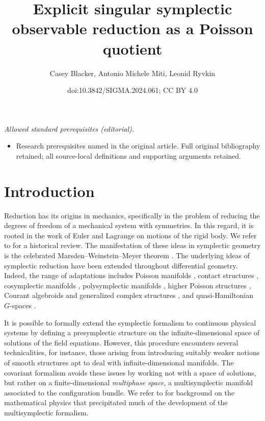 \documentclass[10pt,a4paper]{amsart}
\title{Explicit singular symplectic observable reduction as a Poisson quotient}
\author{Casey Blacker, Antonio Michele Miti, Leonid Ryvkin}
\date{doi:10.3842/SIGMA.2024.061; CC BY 4.0}
\numberwithin{equation}{section}
\begin{document}
\maketitle
\noindent\textit{Allowed standard prerequisites (editorial).}\begin{itemize}
\item Research prerequisites named in the original article. Full original bibliography retained; all source-local definitions and supporting arguments retained.
\end{itemize}\medskip
\section{Introduction}

Reduction has its origins in mechanics, specifically in the problem of reducing the degrees of freedom of a mechanical system with symmetries. In this regard, it is rooted in the work of Euler and Lagrange on motions of the rigid body. We refer to \cite{CendraMarsdenRatiu01, MarsdenWeinstein01} for a historical review. The manifestation of these ideas in symplectic geometry is the celebrated Marsden--Weinstein--Meyer theorem \cite{MarsdenWeinstein74,Meyer73}. The underlying ideas of symplectic reduction have been extended throughout differential geometry. Indeed, the range of adaptations includes Poisson manifolds \cite{MarsdenRatiu86,Willett02}, contact structures \cite{deLeonLainzValcazar19,Willett02}, cosymplectic manifolds \cite{Albert89}, polysymplectic manifolds \cite{MarreroRoman-RoySalgadoVilarino15}, higher Poisson structures \cite{BursztynMartinezAlbaRubio19}, Courant algebroids and generalized complex structures \cite{BursztynCavalcantiGualtieri07,StienonXu08,Vaisman07}, and quasi-Hamiltonian $G$-spaces \cite{AlekseevMalkinMeinrenken98}.


It is possible to formally extend the symplectic formalism to continuous physical systems by defining a presymplectic structure on the infinite-dimensional space of solutions of the field equations.
However, this procedure encounters several technicalities, for instance, those arising from introducing suitably weaker notions of smooth structures apt to deal with infinite-dimensional manifolds.
The covariant formalism avoids these issues by working not with a space of solutions, but rather on a finite-dimensional \emph{multiphase space}, a multisymplectic manifold associated to the configuration bundle.
We refer to \cite{GotayIsenbergMarsden04, GotayIsenbergMarsdenMontgomery98,Helein12,Kijowski73} for background on the mathematical physics that precipitated much of the development of the multisymplectic formalism.
\end{document}
